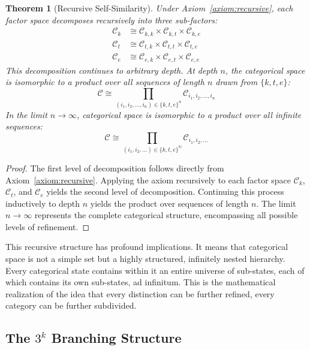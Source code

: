 \documentclass[12pt,a4paper]{article}
\newtheorem{theorem}{Theorem}[section]
\theoremstyle{definition}
\theoremstyle{remark}
\begin{document}
\begin{theorem}[Recursive Self-Similarity]
\label{thm:self_similar}
Under Axiom~\ref{axiom:recursive}, each factor space decomposes recursively into three sub-factors:
\begin{align}
\mathcal{C}_k &\cong \mathcal{C}_{k,k} \times \mathcal{C}_{k,t} \times \mathcal{C}_{k,e} \\
\mathcal{C}_t &\cong \mathcal{C}_{t,k} \times \mathcal{C}_{t,t} \times \mathcal{C}_{t,e} \\
\mathcal{C}_e &\cong \mathcal{C}_{e,k} \times \mathcal{C}_{e,t} \times \mathcal{C}_{e,e}
\end{align}
This decomposition continues to arbitrary depth. At depth $n$, the categorical space is isomorphic to a product over all sequences of length $n$ drawn from $\{k, t, e\}$:
\begin{equation}
\mathcal{C} \cong \prod_{(i_1, i_2, \ldots, i_n) \in \{k,t,e\}^n} \mathcal{C}_{i_1, i_2, \ldots, i_n}
\end{equation}
In the limit $n \to \infty$, categorical space is isomorphic to a product over all infinite sequences:
\begin{equation}
\mathcal{C} \cong \prod_{(i_1, i_2, \ldots) \in \{k,t,e\}^{\mathbb{N}}} \mathcal{C}_{i_1, i_2, \ldots}
\end{equation}
\end{theorem}

\begin{proof}
The first level of decomposition follows directly from Axiom~\ref{axiom:recursive}. Applying the axiom recursively to each factor space $\mathcal{C}_k$, $\mathcal{C}_t$, and $\mathcal{C}_e$ yields the second level of decomposition. Continuing this process inductively to depth $n$ yields the product over sequences of length $n$. The limit $n \to \infty$ represents the complete categorical structure, encompassing all possible levels of refinement.
\end{proof}

This recursive structure has profound implications. It means that categorical space is not a simple set but a highly structured, infinitely nested hierarchy. Every categorical state contains within it an entire universe of sub-states, each of which contains its own sub-states, ad infinitum. This is the mathematical realization of the idea that every distinction can be further refined, every category can be further subdivided.

\subsection{The $3^k$ Branching Structure}
\end{document}
